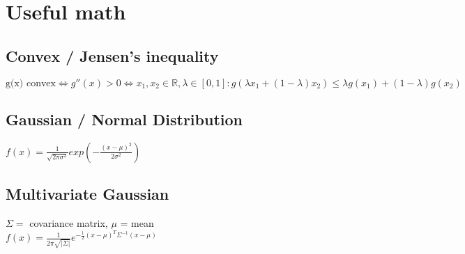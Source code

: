 \section*{Useful math}

\subsection*{Convex / Jensen's inequality}
$\text{g(x) convex} \Leftrightarrow g''(x) > 0 \Leftrightarrow x_1,x_2 \in \mathbb{R}, \lambda \in [0,1]: 
g(\lambda x_1 + (1-\lambda) x_2) \leq \lambda g(x_1) + (1-\lambda) g(x_2)$

\subsection*{Gaussian / Normal Distribution}
$f(x) = \frac{1}{\sqrt{2\pi\sigma^2}} exp(-\frac{(x-\mu)^2}{2\sigma^2})$

\subsection*{Multivariate Gaussian}
$\Sigma =$ covariance matrix, $\mu$ = mean\\
$f(x) = \frac{1}{2\pi \sqrt{|\Sigma|}} e^{- \frac{1}{2} (x-\mu)^T \Sigma^{-1} (x-\mu)}$
